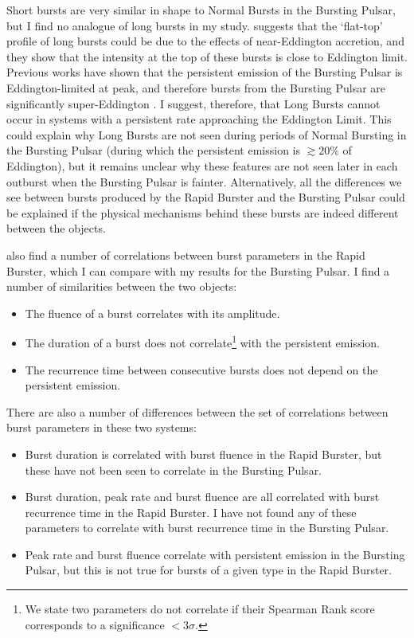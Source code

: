 \par Short bursts are very similar in shape to Normal Bursts in the Bursting Pulsar, but I find no analogue of long bursts in my study.  \citet{Bagnoli_PopStudy} suggests that the `flat-top' profile of long bursts could be due to the effects of near-Eddington accretion, and they show that the intensity at the top of these bursts is close to Eddington limit.  Previous works have shown that the persistent emission of the Bursting Pulsar is Eddington-limited at peak, and therefore bursts from the Bursting Pulsar are significantly super-Eddington \citep{Sazonov_BPGranat}.   I suggest, therefore, that Long Bursts cannot occur in systems with a persistent rate approaching the Eddington Limit.  This could explain why Long Bursts are not seen during periods of Normal Bursting in the Bursting Pulsar (during which the persistent emission is $\gtrsim{20}$\% of Eddington), but it remains unclear why these features are not seen later in each outburst when the Bursting Pulsar is fainter.  Alternatively, all the differences we see between bursts produced by the Rapid Burster and the Bursting Pulsar could be explained if the physical mechanisms behind these bursts are indeed different between the objects.
\par \citet{Bagnoli_PopStudy} also find a number of correlations between burst parameters in the Rapid Burster, which I can compare with my results for the Bursting Pulsar.  I find a number of similarities between the two objects:

\begin{itemize}
\item The fluence of a burst correlates with its amplitude.
\item The duration of a burst does not correlate\footnote{We state two parameters do not correlate if their Spearman Rank score corresponds to a significance $<3\sigma$.} with the persistent emission.
\item The recurrence time between consecutive bursts does not depend on the persistent emission.
 \end{itemize}

\par There are also a number of differences between the set of correlations between burst parameters in these two systems:

\begin{itemize}
\item Burst duration is correlated with burst fluence in the Rapid Burster, but these have not been seen to correlate in the Bursting Pulsar.
\item Burst duration, peak rate and burst fluence are all correlated with burst recurrence time in the Rapid Burster.  I have not found any of these parameters to correlate with burst recurrence time in the Bursting Pulsar.
\item Peak rate and burst fluence correlate with persistent emission in the Bursting Pulsar, but this is not true for bursts of a given type in the Rapid Burster.
\end{itemize}

